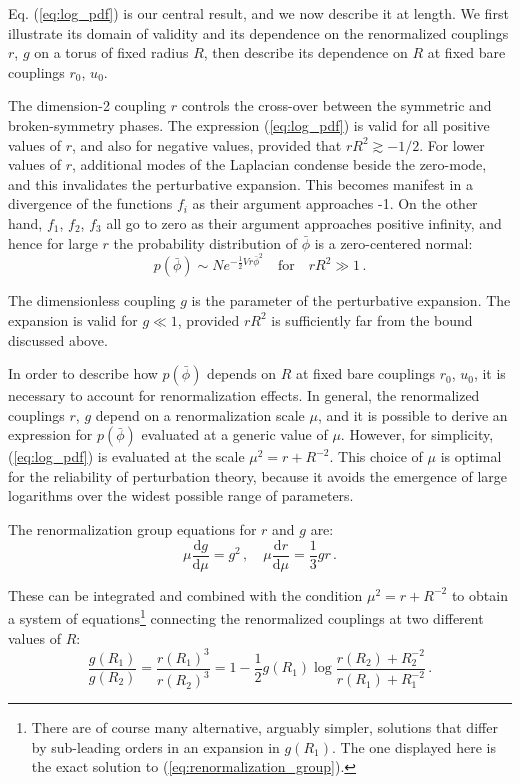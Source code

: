 \documentclass[11pt,a4paper]{article}
\newcommand{\dd}{\mathrm{d}}
\begin{document}
Eq. (\ref{eq:log_pdf}) is our central result, and we now describe it
at length. We first illustrate its domain of validity and its dependence on the
renormalized couplings $r$, $g$ on a torus of fixed radius $R$, then describe
its dependence on $R$ at fixed bare couplings $r_0$, $u_0$.

The dimension-2 coupling $r$ controls the cross-over between the symmetric and
broken-symmetry phases. The expression (\ref{eq:log_pdf}) is valid for all
positive values of $r$, and also for negative values, provided that $rR^2
\gtrsim -1/2$.  For lower values of $r$, additional modes of the Laplacian
condense beside the zero-mode, and this invalidates the perturbative expansion.
This becomes manifest in a divergence of the functions $f_i$ as their argument
approaches -1.  On the other hand, $f_1$, $f_2$, $f_3$ all go to zero as their
argument approaches positive infinity, and hence for large $r$ the probability
distribution of $\bar{\phi}$ is a zero-centered normal:
\begin{equation}
    p(\bar{\phi}) \sim N e^{- \frac{1}{2} V r \bar{\phi}^2}
  \quad \text{for} \quad
  rR^2 \gg 1\,.
\end{equation}

The dimensionless coupling $g$ is the parameter of the perturbative expansion.
The expansion is valid for $g \ll 1$, provided $rR^2$ is sufficiently far from
the bound discussed above.

In order to describe how $p(\bar{\phi})$ depends on $R$ at fixed bare couplings
$r_0$, $u_0$, it is necessary to account for renormalization effects. In
general, the renormalized couplings $r$, $g$ depend on a renormalization scale
$\mu$, and it is possible to derive an expression for $p(\bar{\phi})$ evaluated
at a generic value of $\mu$. However, for simplicity,
(\ref{eq:log_pdf}) is evaluated at the scale $\mu^2 = r + R^{-2}$.
This choice of $\mu$ is optimal for the reliability of perturbation theory,
because it avoids the emergence of large logarithms over the widest possible
range of parameters.

The renormalization group equations for $r$ and $g$ are:
\begin{equation}
  \label{eq:renormalization_group}
  \mu \frac{\dd g}{\dd \mu} = g^2\,,\quad
  \mu \frac{\dd r}{\dd \mu} = \frac{1}{3}g r\,.
\end{equation}

These can be integrated and combined with the condition $\mu^2 = r + R^{-2}$ to
obtain a system of equations\footnote{There are of course many alternative,
arguably simpler, solutions that differ by sub-leading orders in an expansion in
$g(R_1)$. The one displayed here is the exact solution to
(\ref{eq:renormalization_group}).} connecting the renormalized couplings at two
different values of $R$:
\begin{equation}
  \frac{g(R_1)}{g(R_2)} = \frac{r(R_1)^3}{r(R_2)^3} = 
  1 - \frac{1}{2} g(R_1)\log\frac{r(R_2) + R_2^{-2}}{r(R_1) + R_1^{-2}}\,.
\end{equation}
\end{document}
